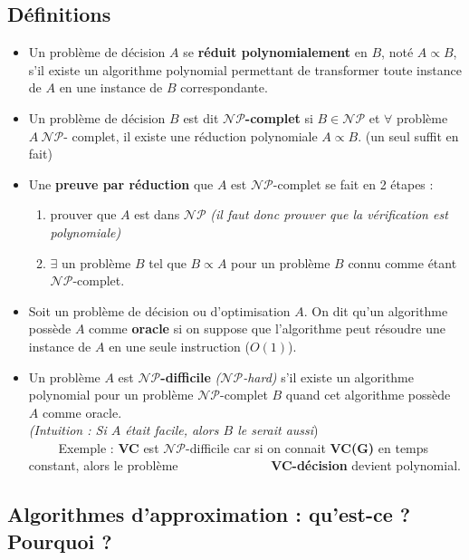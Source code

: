 \documentclass{article}
\begin{document}
\begin{sffamily}
\subsection*{Définitions}

\begin{itemize}
\item Un problème de décision $A$ se \textbf{réduit polynomialement} en $B$, noté $A\propto B$, s'il existe un algorithme polynomial 
permettant de transformer toute instance de $A$ en une instance de $B$ correspondante.
\item Un problème de décision $B$ est dit \textbf{$\mathcal{NP}$-complet} si $B \in \mathcal{NP}$ et $\forall$ problème $A\ \mathcal{NP}$-
complet, il existe une réduction polynomiale $A\propto B$. (un seul suffit en fait)
\item Une \textbf{preuve par réduction} que $A$ est $\mathcal{NP}$-complet se fait en 2 étapes :
\begin{enumerate}
\item prouver que $A$ est dans $\mathcal{NP}$ \textit{(il faut donc prouver que la vérification est polynomiale)}
\item $\exists$ un problème $B$ tel que $B\propto A$ pour un problème $B$ connu comme étant $\mathcal{NP}$-complet.
\end{enumerate}
\item Soit un problème de décision ou d'optimisation $A$. On dit qu'un algorithme possède $A$ comme \textbf{oracle} si on suppose que
l'algorithme peut résoudre une instance de $A$ en une seule instruction ($O(1)$).
\item Un problème $A$ est \textbf{$\mathcal{NP}$-difficile} \textit{($\mathcal{NP}$-hard)} s'il existe un algorithme polynomial pour un 
problème $\mathcal{NP}$-complet $B$ quand cet algorithme possède $A$ comme oracle. \\ \textit{(Intuition : Si $A$ était facile, alors $B$ 
le serait aussi})\\
\indent$\qquad$ Exemple : \textbf{VC} est $\mathcal{NP}$-difficile car si on connait \textbf{VC(G)} en temps constant, alors le problème 
\indent$\qquad\qquad\qquad\quad$\textbf{VC-décision} devient polynomial.
\end{itemize}

\subsection{Algorithmes d'approximation : qu'est-ce ? Pourquoi ?}


\end{sffamily}
\end{document}

